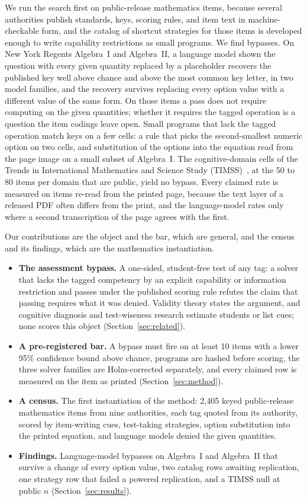 We run the search first on public-release mathematics items, because several authorities publish standards, keys, scoring rules, and item text in machine-checkable form, and the catalog of shortcut strategies for those items is developed enough to write capability restrictions as small programs. We find bypasses. On New York Regents Algebra~I and Algebra~II, a language model shown the question with every given quantity replaced by a placeholder recovers the published key well above chance and above the most common key letter, in two model families, and the recovery survives replacing every option value with a different value of the same form. On those items a pass does not require computing on the given quantities; whether it requires the tagged operation is a question the item codings leave open. Small programs that lack the tagged operation match keys on a few cells: a rule that picks the second-smallest numeric option on two cells, and substitution of the options into the equation read from the page image on a small subset of Algebra~I. The cognitive-domain cells of the Trends in International Mathematics and Science Study (TIMSS)~\cite{iea2009timss2011frameworks}, at the 50 to 80 items per domain that are public, yield no bypass. Every claimed rate is measured on items re-read from the printed page, because the text layer of a released PDF often differs from the print, and the language-model rates only where a second transcription of the page agrees with the first.

Our contributions are the object and the bar, which are general, and the census and its findings, which are the mathematics instantiation.

\begin{itemize}
\item \textbf{The assessment bypass.} A one-sided, student-free test of any tag: a solver that lacks the tagged competency by an explicit capability or information restriction and passes under the published scoring rule refutes the claim that passing requires what it was denied. Validity theory states the argument, and cognitive diagnosis and test-wiseness research estimate students or list cues; none scores this object (Section~\ref{sec:related}).
\item \textbf{A pre-registered bar.} A bypass must fire on at least 10 items with a lower 95\% confidence bound above chance, programs are hashed before scoring, the three solver families are Holm-corrected separately, and every claimed row is measured on the item as printed (Section~\ref{sec:method}).
\item \textbf{A census.} The first instantiation of the method: 2{,}405 keyed public-release mathematics items from nine authorities, each tag quoted from its authority, scored by item-writing cues, test-taking strategies, option substitution into the printed equation, and language models denied the given quantities.
\item \textbf{Findings.} Language-model bypasses on Algebra~I and Algebra~II that survive a change of every option value, two catalog rows awaiting replication, one strategy row that failed a powered replication, and a TIMSS null at public $n$ (Section~\ref{sec:results}).
\end{itemize}
